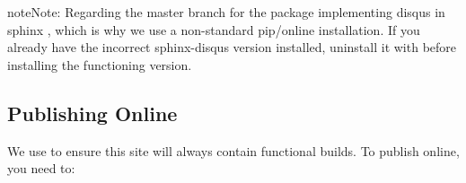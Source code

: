 \documentclass[letterpaper,10pt,english]{sphinxmanual}
\begin{document}
\begin{sphinxadmonition}{note}{Note:}
Regarding  the master branch for the package implementing disqus in sphinx , which is why we use a non-standard pip/online installation. If you already have the incorrect sphinx-disqus version installed, uninstall it with  before installing the functioning version.
\end{sphinxadmonition}


\subsection{Publishing Online}
\label{\detokenize{Textbook_Creation_Help/rst_intro:publishing-online}}\label{\detokenize{Textbook_Creation_Help/rst_intro:heading-publishing-online}}
We use  to ensure this site will always contain functional builds. To publish online, you need to:
\end{document}
